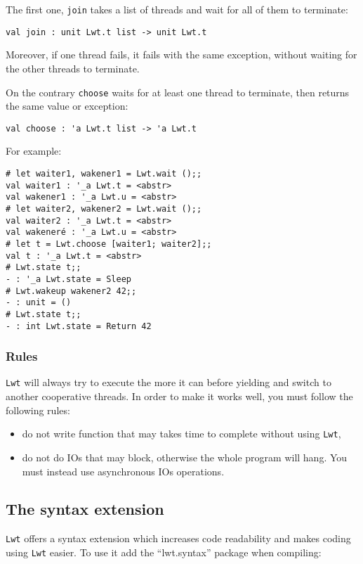 \documentclass{article}
\newcommand{\lwt}{\texttt{Lwt}\xspace}
\begin{document}
The first one, \texttt{join} takes a list of threads and wait for all
of them to terminate:

\begin{verbatim}
val join : unit Lwt.t list -> unit Lwt.t
\end{verbatim}

Moreover, if one thread fails, it fails with the same exception,
without waiting for the other threads to terminate.

On the contrary \texttt{choose} waits for at least one thread to
terminate, then returns the same value or exception:

\begin{verbatim}
val choose : 'a Lwt.t list -> 'a Lwt.t
\end{verbatim}

For example:

\begin{verbatim}
# let waiter1, wakener1 = Lwt.wait ();;
val waiter1 : '_a Lwt.t = <abstr>
val wakener1 : '_a Lwt.u = <abstr>
# let waiter2, wakener2 = Lwt.wait ();;
val waiter2 : '_a Lwt.t = <abstr>
val wakeneré : '_a Lwt.u = <abstr>
# let t = Lwt.choose [waiter1; waiter2];;
val t : '_a Lwt.t = <abstr>
# Lwt.state t;;
- : '_a Lwt.state = Sleep
# Lwt.wakeup wakener2 42;;
- : unit = ()
# Lwt.state t;;
- : int Lwt.state = Return 42
\end{verbatim}

\subsubsection{Rules}

\lwt will always try to execute the more it can before yielding and
switch to another cooperative threads. In order to make it works well,
you must follow the following rules:

\begin{itemize}
\item do not write function that may takes time to complete without
  using \lwt,
\item do not do IOs that may block, otherwise the whole program will
  hang. You must instead use asynchronous IOs operations.
\end{itemize}

\subsection{The syntax extension}

\lwt offers a syntax extension which increases code readability and
makes coding using \lwt easier.  To use it add the ``lwt.syntax'' package when
compiling:
\end{document}
